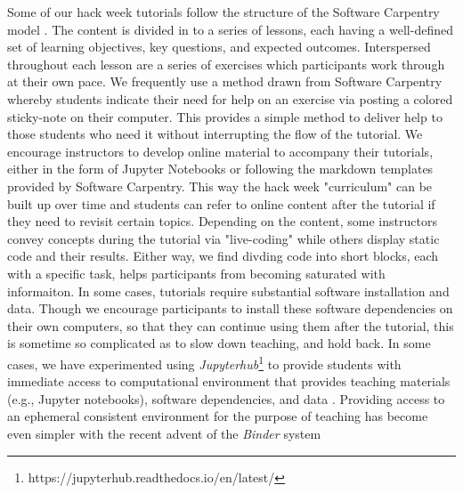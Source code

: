 \documentclass{nature}
\begin{document}
Some of our hack week tutorials follow the structure of the Software Carpentry model \cite{b:wilson-swc-lessons-2016}. The content is divided in to a series of lessons, each having a well-defined set of learning objectives, key questions, and expected outcomes. Interspersed throughout each lesson are a series of exercises which participants work through at their own pace. We frequently use a method drawn from Software Carpentry whereby students indicate their need for help on an exercise via posting a colored sticky-note on their computer. This provides a simple method to deliver help to those students who need it without interrupting the flow of the tutorial. We encourage instructors to develop online material to accompany their tutorials, either in the form of Jupyter Notebooks \cite{kluyver2016jupyter} or following the markdown templates provided by Software Carpentry. This way the hack week "curriculum" can be built up over time and students can refer to online content after the tutorial if they need to revisit certain topics. Depending on the content, some instructors convey concepts during the tutorial via "live-coding" while others display static code and their results. Either way, we find divding code into short blocks, each with a specific task, helps participants from becoming saturated with informaiton.
In some cases, tutorials require substantial software installation and data. Though we encourage participants to install these software dependencies on their own computers, so that they can continue using them after the tutorial, this is sometime so complicated as to slow down teaching, and hold back. In some cases, we have experimented using \emph{Jupyterhub}\footnote{https://jupyterhub.readthedocs.io/en/latest/} to provide students with immediate access to computational environment that provides teaching materials (e.g., Jupyter notebooks), software dependencies, and data \cite{holdgraf2017portable}. Providing access to an ephemeral consistent environment for the purpose of teaching has become even simpler with the recent advent of the \emph{Binder} system \cite{Holdgraf2017-pd, Titus_Brown_undated-pc}
\end{document}
